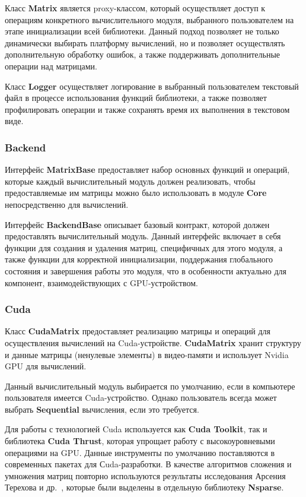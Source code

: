 Класс \textbf{Matrix} является proxy-классом, который осуществляет доступ к операциям конкретного вычислительного модуля, выбранного пользователем на этапе инициализации всей библиотеки.
Данный подход позволяет не только динамически выбирать платформу вычислений, 
но и позволяет осуществлять дополнительную обработку ошибок, 
а также поддерживать дополнительные операции над матрицами.

Класс \textbf{Logger} осуществляет логирование в выбранный пользователем текстовый файл в процессе использования функций библиотеки, а также позволяет профилировать операции и также сохранять время их выполнения в текстовом виде.

\subsubsection*{Backend}

Интерфейс \textbf{MatrixBase} предоставляет набор основных функций и операций, которые каждый вычислительный модуль должен реализовать, чтобы предоставляемые им матрицы можно было использовать в модуле \textbf{Core} непосредственно для вычислений.

Интерфейс \textbf{BackendBase} описывает базовый контракт, которой должен предоставлять вычислительный модуль. Данный интерфейс включает в себя функции для создания и удаления матриц, специфичных для этого модуля, а также функции для корректной инициализации, поддержания глобального состояния и завершения работы это модуля, что в особенности актуально для компонент, взаимодействующих с GPU-устройством.

\subsubsection*{Cuda}

Класс \textbf{CudaMatrix} предоставляет реализацию матрицы и операций для осуществления вычислений на Cuda-устройстве. \textbf{CudaMatrix} хранит структуру и данные матрицы (ненулевые элементы) в видео-памяти и использует Nvidia GPU для вычислений. 

Данный вычислительный модуль выбирается по умолчанию, если в компьютере пользователя имеется Cuda-устройство.
Однако пользователь всегда может выбрать \textbf{Sequential} вычисления, если это требуется. 

Для работы с технологией Cuda используется как \textbf{Cuda Toolkit}, так и библиотека \textbf{Cuda Thrust}, которая упрощает работу с высокоуровневыми операциями на GPU. Данные инструменты по умолчанию поставляются в современных пакетах для Сuda-разработки. В качестве алгоритмов сложения и умножения матриц повторно используются результаты исследования Арсения Терехова и др.~\cite{inproceedings:cfqp_matrix_with_single_source}, которые были выделены в отдельную библиотеку \textbf{Nsparse}.


